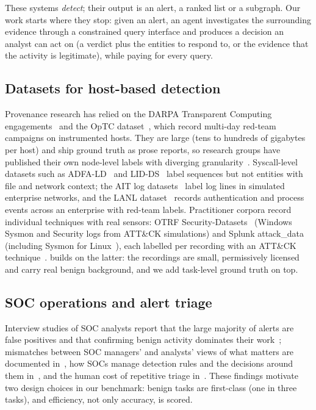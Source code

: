 These systems \emph{detect}; their output is an alert, a ranked list or a subgraph. Our work starts where
they stop: given an alert, an agent investigates the surrounding evidence through a constrained query
interface and produces a decision an analyst can act on (a verdict plus the entities to respond to, or the
evidence that the activity is legitimate), while paying for every query.

\subsection{Datasets for host-based detection}
Provenance research has relied on the DARPA Transparent Computing engagements~\cite{darpa_tc} and the
OpTC dataset~\cite{darpa_optc}, which record multi-day red-team campaigns on instrumented hosts. They are
large (tens to hundreds of gigabytes per host) and ship ground truth as prose reports, so research groups
have published their own node-level labels with diverging granularity~\cite{jiang2025orthrus,wang2022threatrace,pidsmaker_repo}.
Syscall-level datasets such as ADFA-LD~\cite{creech2013adfa} and LID-DS~\cite{grimmer2023lidds} label sequences but not
entities with file and network context; the AIT log datasets~\cite{landauer2023maintainable} label log lines in
simulated enterprise networks, and the LANL dataset~\cite{kent2016lanl} records authentication and process
events across an enterprise with red-team labels. Practitioner corpora record individual techniques with
real sensors: OTRF Security-Datasets~\cite{otrf_securitydatasets} (Windows Sysmon and Security logs
from ATT\&CK simulations) and Splunk attack\_data~\cite{splunk_attackdata} (including Sysmon for
Linux~\cite{microsoft_sysmonforlinux}), each labelled per recording with an ATT\&CK technique~\cite{strom2018attack}.
\bench builds on the latter: the recordings are small, permissively licensed and carry real benign
background, and we add task-level ground truth on top.

\subsection{SOC operations and alert triage}
Interview studies of SOC analysts report that the large majority of alerts are false positives and that
confirming benign activity dominates their work~\cite{alahmadi2022falsepositives}; mismatches between SOC
managers' and analysts' views of what matters are documented in~\cite{kokulu2019soc}, how SOCs manage
detection rules and the decisions around them in~\cite{vermeer2023alertalchemy}, and the human cost of
repetitive triage in~\cite{sundaramurthy2015burnout}. These findings motivate two design choices in our
benchmark: benign tasks are first-class (one in three tasks), and efficiency, not only accuracy, is scored.

